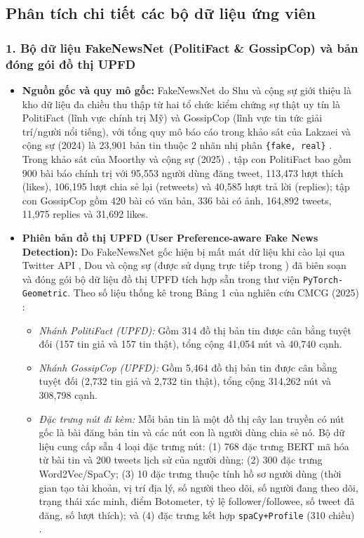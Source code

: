 \documentclass[11pt,a4paper]{extreport}
\begin{document}
\subsection{Phân tích chi tiết các bộ dữ liệu ứng viên}

\subsubsection{1. Bộ dữ liệu FakeNewsNet (PolitiFact \& GossipCop) và bản đóng gói đồ thị UPFD}
\begin{itemize}
    \item \textbf{Nguồn gốc và quy mô gốc:} FakeNewsNet do Shu và cộng sự giới thiệu là kho dữ liệu đa chiều thu thập từ hai tổ chức kiểm chứng sự thật uy tín là PolitiFact (lĩnh vực chính trị Mỹ) và GossipCop (lĩnh vực tin tức giải trí/người nổi tiếng), với tổng quy mô báo cáo trong khảo sát của Lakzaei và cộng sự (2024) là 23,901 bản tin thuộc 2 nhãn nhị phân \texttt{\{fake, real\}} \cite{noauthor_disinformation_2024, noauthor_improving_2025}. Trong khảo sát của Moorthy và cộng sự (2025) \cite{noauthor_dual_2025}, tập con PolitiFact bao gồm 900 bài báo chính trị với 95,553 người dùng đăng tweet, 113,473 lượt thích (likes), 106,195 lượt chia sẻ lại (retweets) và 40,585 lượt trả lời (replies); tập con GossipCop gồm 420 bài có văn bản, 336 bài có ảnh, 164,892 tweets, 11,975 replies và 31,692 likes.
    \item \textbf{Phiên bản đồ thị UPFD (User Preference-aware Fake News Detection):} Do FakeNewsNet gốc hiện bị mất mát dữ liệu khi cào lại qua Twitter API \cite{noauthor_exploiting_2024}, Dou và cộng sự (được sử dụng trực tiếp trong \cite{noauthor_ensemble_2024, noauthor_co-attention_2025}) đã biên soạn và đóng gói bộ dữ liệu đồ thị UPFD tích hợp sẵn trong thư viện \texttt{PyTorch-Geometric}. Theo số liệu thống kê trong Bảng 1 của nghiên cứu CMCG (2025) \cite{noauthor_co-attention_2025}:
    \begin{itemize}
        \item \textit{Nhánh PolitiFact (UPFD):} Gồm 314 đồ thị bản tin được cân bằng tuyệt đối (157 tin giả và 157 tin thật), tổng cộng 41,054 nút và 40,740 cạnh.
        \item \textit{Nhánh GossipCop (UPFD):} Gồm 5,464 đồ thị bản tin được cân bằng tuyệt đối (2,732 tin giả và 2,732 tin thật), tổng cộng 314,262 nút và 308,798 cạnh.
        \item \textit{Đặc trưng nút đi kèm:} Mỗi bản tin là một đồ thị cây lan truyền có nút gốc là bài đăng bản tin và các nút con là người dùng chia sẻ nó. Bộ dữ liệu cung cấp sẵn 4 loại đặc trưng nút: (1) 768 đặc trưng BERT mã hóa từ bài tin và 200 tweets lịch sử của người dùng; (2) 300 đặc trưng Word2Vec/SpaCy; (3) 10 đặc trưng thuộc tính hồ sơ người dùng (thời gian tạo tài khoản, vị trí địa lý, số người theo dõi, số người đang theo dõi, trạng thái xác minh, điểm Botometer, tỷ lệ follower/followee, số tweet đã đăng, số lượt thích); và (4) đặc trưng kết hợp \texttt{spaCy+Profile} (310 chiều) \cite{noauthor_ensemble_2024, noauthor_co-attention_2025}.

\end{itemize}
\end{itemize}
\end{document}
